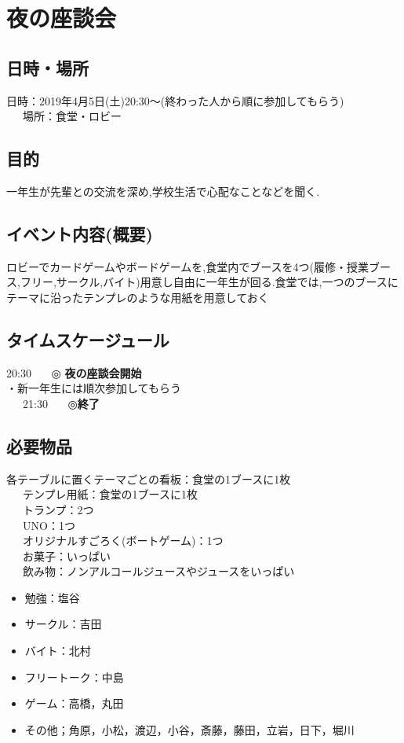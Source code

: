 
\section{夜の座談会}
\subsection{日時・場所}
日時：2019年4月5日(土)20:30〜(終わった人から順に参加してもらう)\\
\ \ \ 場所：食堂・ロビー\\
\subsection{目的}
一年生が先輩との交流を深め,学校生活で心配なことなどを聞く.
\subsection{イベント内容(概要)}
ロビーでカードゲームやボードゲームを,食堂内でブースを4つ(履修・授業ブース,フリー,サークル,バイト)用意し自由に一年生が回る.食堂では,一つのブースに
テーマに沿ったテンプレのような用紙を用意しておく
\subsection{タイムスケージュール}
20:30 \ \ \ ◎ \textbf{夜の座談会開始}\\
\hspace{15mm}・新一年生には順次参加してもらう \\
\ \ \ 21:30 \ \ \ ◎\textbf{終了}
\subsection{必要物品}
各テーブルに置くテーマごとの看板：食堂の1ブースに1枚\\
\ \ \ テンプレ用紙：食堂の1ブースに1枚\\
\ \ \ トランプ：2つ\\
\ \ \ UNO：1つ\\
\ \ \ オリジナルすごろく(ボートゲーム)：1つ\\
\ \ \ お菓子：いっぱい\\
\ \ \ 飲み物：ノンアルコールジュースやジュースをいっぱい
\begin{itemize}
\item 勉強：塩谷
\item サークル：吉田
\item バイト：北村
\item フリートーク：中島
\item ゲーム：高橋，丸田
\item その他；角原，小松，渡辺，小谷，斎藤，藤田，立岩，日下，堀川
\end{itemize}
